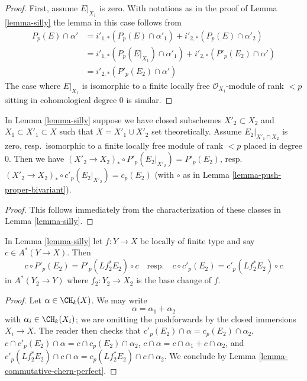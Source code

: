 \begin{proof}
First, assume $E|_{X_1}$ is zero.
With notations as in the proof of Lemma \ref{lemma-silly}
the lemma in this case follows from
\begin{align*}
P_p(E) \cap \alpha'
& =
i'_{1, *}(P_p(E) \cap \alpha'_1) +
i'_{2, *}(P_p(E) \cap \alpha'_2) \\
& =
i'_{1, *}(P_p(E|_{X_1}) \cap \alpha'_1) +
i'_{2, *}(P'_p(E_2) \cap \alpha') \\
& =
i'_{2, *}(P'_p(E_2) \cap \alpha')
\end{align*}
The case where $E|_{X_1}$ is isomorphic to a finite locally free
$\mathcal{O}_{X_1}$-module of rank $< p$ sitting in cohomological degree $0$
is similar.
\end{proof}

\begin{lemma}
\label{lemma-silly-shrink}
In Lemma \ref{lemma-silly} suppose we have closed subschemes
$X'_2 \subset X_2$ and $X_1 \subset X'_1 \subset X$ such that
$X = X'_1 \cup X'_2$ set theoretically. Assume $E_2|_{X'_1 \cap X_2}$
is zero, resp.\ isomorphic to a finite locally free module
of rank $< p$ placed in degree $0$. Then we have
$(X'_2 \to X_2)_* \circ P'_p(E_2|_{X'_2}) = P'_p(E_2)$,
resp.\  $(X'_2 \to X_2)_* \circ c'_p(E_2|_{X'_2}) = c_p(E_2)$
(with $\circ$ as in Lemma \ref{lemma-push-proper-bivariant}).
\end{lemma}

\begin{proof}
This follows immediately from the characterization of these classes
in Lemma \ref{lemma-silly}.
\end{proof}

\begin{lemma}
\label{lemma-silly-commutes}
In Lemma \ref{lemma-silly} let $f : Y \to X$ be locally of finite type
and say $c \in A^*(Y \to X)$. Then
$$
c \circ P'_p(E_2) = P'_p(Lf_2^*E_2) \circ c
\quad\text{resp.}\quad
c \circ c'_p(E_2) = c'_p(Lf_2^*E_2) \circ c
$$
in $A^*(Y_2 \to Y)$ where $f_2 : Y_2 \to X_2$ is the base change of $f$.
\end{lemma}

\begin{proof}
Let $\alpha \in \CH_k(X)$. We may write
$$
\alpha = \alpha_1 + \alpha_2
$$
with $\alpha_i \in \CH_k(X_i)$; we are omitting the pushforwards
by the closed immersions $X_i \to X$. The reader then checks that
$c'_p(E_2) \cap \alpha = c_p(E_2) \cap \alpha_2$,
$c \cap c'_p(E_2) \cap \alpha = c \cap c_p(E_2) \cap \alpha_2$,
$c \cap \alpha = c \cap \alpha_1 + c \cap \alpha_2$, and
$c'_p(Lf_2^*E_2) \cap c \cap \alpha = c_p(Lf_2^*E_2) \cap c \cap \alpha_2$.
We conclude by Lemma \ref{lemma-commutative-chern-perfect}.
\end{proof}

